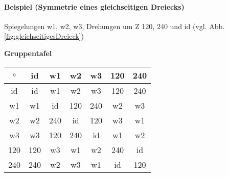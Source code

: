 \paragraph{Beispiel (Symmetrie eines gleichseitigen Dreiecks)}
Spiegelungen w1, w2, w3, Drehungen um Z 120, 240 und id (vgl. Abb. \ref{fig:gleichseitigesDreieck})



\textbf{Gruppentafel}\\
\begin{tabular}{|c|c|c|c|c|c|c|}
\hline $\circ$ & id & w1 & w2 & w3 & 120 & 240 \\ 
\hline id & id & w1 & w2 & w3 & 120 & 240 \\ 
\hline w1 & w1 & id & 120 & 240 & w2 & w3 \\ 
\hline w2 & w2 & 240 & id & 120 & w3 & w1 \\ 
\hline w3 & w3 & 120 & 240 & id & w1 & w2 \\ 
\hline 120 & 120 & w3 & w1 & w2 & 240 & id \\ 
\hline 240 & 240 & w2 & w3 & w1 & id & 120 \\ 
\hline 
\end{tabular} 
